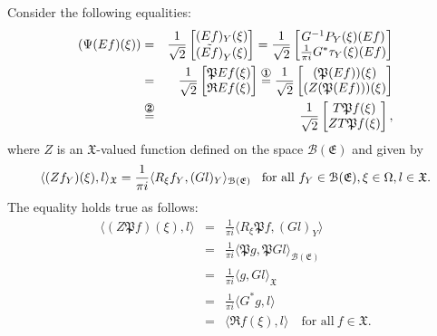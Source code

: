 \documentclass [12pt,reqno]{amsart}
\numberwithin{equation}{subsection}
\numberwithin{equation}{section}
\begin{document}
Consider the following equalities:
\begin{eqnarray*}
(\Psi(Ef)(\xi)) &=&  \frac{1}{\sqrt{2}}
                    \begin{bmatrix} 
                       	(Ef)_Y(\xi)  \\
                    	\tilde{(Ef)}_Y(\xi) \\
                    	\end{bmatrix}
               =  \frac{1}{\sqrt{2}} \begin{bmatrix} 
	                   G^{-1}P_{Y}(\xi)(Ef)  \\   	                      \frac{1}{\pi i} G^*\tau_{Y}(\xi)(Ef) \\
                	\end{bmatrix}	\\
                	 &=& \frac{1}{\sqrt{2}} \begin{bmatrix} 
	             \mathfrak{P}Ef(\xi)  \\
                    	\mathfrak{R}Ef(\xi) \\
	                  \end{bmatrix}
               \overset{\mbox{\ding{172}}}{=} \frac{1}{\sqrt{2}}\begin{bmatrix} 
                 	( \mathfrak{P}(Ef))(\xi)  \\
                 	(Z(\mathfrak{P}(Ef)))(\xi) \\
                 	\end{bmatrix}	\\ 
              & \overset{\mbox{\ding{173}}}{=}&  	\frac{1}{\sqrt{2}}\begin{bmatrix} 
                 	T \mathfrak{P}f(\xi)  \\
                 	ZT\mathfrak{P}f(\xi) \\
                 	\end{bmatrix}	,     	             
\end{eqnarray*}
where $Z$ is an $\mathfrak{X}$-valued function defined on the space $\mathcal{B}(\mathfrak{E})$ and given by 
 \begin{equation} \label{Equation 3.38}
 \langle (Zf_Y)(\xi), l \rangle_{\mathfrak{X}}= \frac{1}{\pi i}\langle R_{\xi}f_Y, (Gl)_Y \rangle_{\mathcal{B}(\mathfrak{E})} 
\hspace{0.3cm} \text{for all}~ f_Y \in \mathcal{B}(\mathfrak{E}), \xi \in \Omega, l \in \mathfrak{X}.
\end{equation}
The equality  holds true as follows:
\begin{eqnarray*}
\langle (Z \mathfrak{P}f)(\xi), l \rangle
    &=& \frac{1}{\pi i} \langle R_{\xi} \mathfrak{P}f, (Gl)_Y \rangle  \\
    &=& \frac{1}{\pi i} \langle \mathfrak{P}g, \mathfrak{P}Gl \rangle_{\mathcal{B}(\mathfrak{E})} \\
    &=& \frac{1}{\pi i} \langle g, Gl \rangle_{\mathfrak{X}} \\
    &=& \frac{1}{\pi i} \langle G^*g, l \rangle \\
    &=& \langle \mathfrak{R}f(\xi), l \rangle \quad \text{for all}~ f \in \mathfrak{X}.
\end{eqnarray*}
\end{document}
